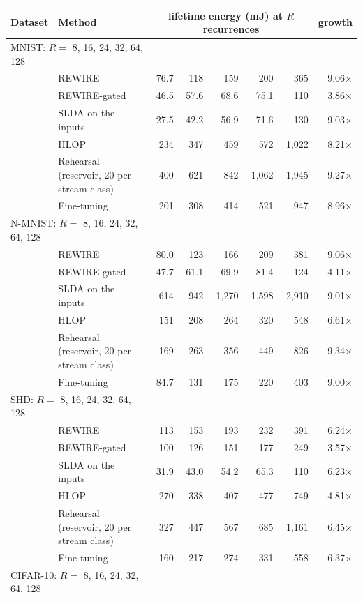 \begin{tabular*}{\textwidth}{@{\extracolsep{\fill}}llrrrrrr@{}}
\toprule
Dataset & Method & \multicolumn{5}{c}{lifetime energy (mJ) at $R$ recurrences} & growth \\
\midrule
\multicolumn{2}{l}{MNIST: $R=$ 8, 16, 24, 32, 64, 128} &  &  &  &  &  &  \\
 & REWIRE & 76.7 & 118 & 159 & 200 & 365 & 9.06$\times$ \\
 & REWIRE-gated & 46.5 & 57.6 & 68.6 & 75.1 & 110 & 3.86$\times$ \\
 & SLDA on the inputs & 27.5 & 42.2 & 56.9 & 71.6 & 130 & 9.03$\times$ \\
 & HLOP & 234 & 347 & 459 & 572 & 1,022 & 8.21$\times$ \\
 & Rehearsal (reservoir, 20 per stream class) & 400 & 621 & 842 & 1,062 & 1,945 & 9.27$\times$ \\
 & Fine-tuning & 201 & 308 & 414 & 521 & 947 & 8.96$\times$ \\
\multicolumn{2}{l}{N-MNIST: $R=$ 8, 16, 24, 32, 64, 128} &  &  &  &  &  &  \\
 & REWIRE & 80.0 & 123 & 166 & 209 & 381 & 9.06$\times$ \\
 & REWIRE-gated & 47.7 & 61.1 & 69.9 & 81.4 & 124 & 4.11$\times$ \\
 & SLDA on the inputs & 614 & 942 & 1,270 & 1,598 & 2,910 & 9.01$\times$ \\
 & HLOP & 151 & 208 & 264 & 320 & 548 & 6.61$\times$ \\
 & Rehearsal (reservoir, 20 per stream class) & 169 & 263 & 356 & 449 & 826 & 9.34$\times$ \\
 & Fine-tuning & 84.7 & 131 & 175 & 220 & 403 & 9.00$\times$ \\
\multicolumn{2}{l}{SHD: $R=$ 8, 16, 24, 32, 64, 128} &  &  &  &  &  &  \\
 & REWIRE & 113 & 153 & 193 & 232 & 391 & 6.24$\times$ \\
 & REWIRE-gated & 100 & 126 & 151 & 177 & 249 & 3.57$\times$ \\
 & SLDA on the inputs & 31.9 & 43.0 & 54.2 & 65.3 & 110 & 6.23$\times$ \\
 & HLOP & 270 & 338 & 407 & 477 & 749 & 4.81$\times$ \\
 & Rehearsal (reservoir, 20 per stream class) & 327 & 447 & 567 & 685 & 1,161 & 6.45$\times$ \\
 & Fine-tuning & 160 & 217 & 274 & 331 & 558 & 6.37$\times$ \\
\multicolumn{2}{l}{CIFAR-10: $R=$ 8, 16, 24, 32, 64, 128} &  &  &  &  &  &  \\

\end{tabular*}
